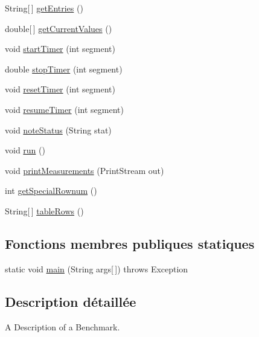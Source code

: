 \begin{DoxyCompactItemize}
\item 
String\mbox{[}$\,$\mbox{]} \hyperlink{classjnt_1_1Bench_1_1Bench_a27eb6aee303297391d4db18e7292f393}{get\-Entries} ()
\item 
double\mbox{[}$\,$\mbox{]} \hyperlink{classjnt_1_1Bench_1_1Bench_af129c2c1c9f0fd0521c588fbe0858316}{get\-Current\-Values} ()
\item 
void \hyperlink{classjnt_1_1Bench_1_1Bench_adc4f56129d2d520fa053b6e897fae603}{start\-Timer} (int segment)
\item 
double \hyperlink{classjnt_1_1Bench_1_1Bench_ac2d936cd5bdbac44cbafd32b2d45bed5}{stop\-Timer} (int segment)
\item 
void \hyperlink{classjnt_1_1Bench_1_1Bench_a0c644e38e53da02d84e58de1699abdb0}{reset\-Timer} (int segment)
\item 
void \hyperlink{classjnt_1_1Bench_1_1Bench_ae16a57561b6556f5af23b8259a1eaad2}{resume\-Timer} (int segment)
\item 
void \hyperlink{classjnt_1_1Bench_1_1Bench_ac48b97a06575941423b1205eafee97b8}{note\-Status} (String stat)
\item 
void \hyperlink{classjnt_1_1Bench_1_1Bench_a9c4d4fd8e2c1683354606583b3cf34b2}{run} ()
\item 
void \hyperlink{classjnt_1_1Bench_1_1Bench_aaa30c2b9e9c2ceb32577f62797f25238}{print\-Measurements} (Print\-Stream out)
\item 
int \hyperlink{classjnt_1_1Bench_1_1Bench_a949dc538333236c1f4b56cf889b99e49}{get\-Special\-Rownum} ()
\item 
String\mbox{[}$\,$\mbox{]} \hyperlink{classjnt_1_1Bench_1_1Bench_a1e7862017e65305a9c156d7880b25448}{table\-Rows} ()
\end{DoxyCompactItemize}
\subsection*{Fonctions membres publiques statiques}
\begin{DoxyCompactItemize}
\item 
static void \hyperlink{classjnt_1_1Bench_1_1Bench_a95016eb20f5349e06fb6db2ccb78b2f9}{main} (String args\mbox{[}$\,$\mbox{]})  throws Exception 
\end{DoxyCompactItemize}


\subsection{Description détaillée}
A Description of a Benchmark.

